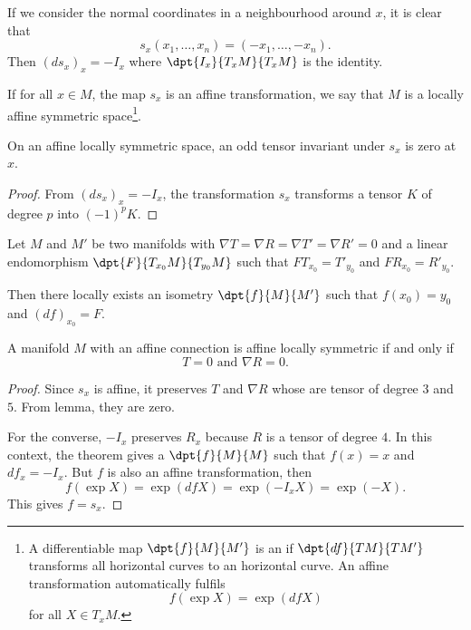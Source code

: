 If we consider the normal coordinates in a neighbourhood around $x$, it is clear that 
\[
s_x(x_1,\ldots,x_n)=(-x_1,\ldots,-x_n).
\]
 Then $(ds_x)_x=-I_x$ where $\dpt{I_x}{T_xM}{T_xM}$ is the identity.

If for all $x\in M$, the map $s_x$ is an affine transformation, we say that $M$ is a locally affine symmetric space\footnote{A differentiable map $\dpt{f}{M}{M'}$ is an  if $\dpt{df}{TM}{TM'}$ transforms all horizontal curves to an horizontal curve. An affine transformation automatically fulfils
\[
  f(\exp X)=\exp(df X)
\]
for all $X\in T_xM$.}.


\begin{lemma}
On an affine locally symmetric space, an odd tensor invariant under $s_x$ is zero at $x$.
\end{lemma}

\begin{proof}
From $(ds_x)_x=-I_x$, the transformation $s_x$ transforms a tensor $K$ of degree $p$ into $(-1)^p K$.
\end{proof}


\begin{theorem}
Let $M$ and $M'$ be two manifolds with $\nabla T=\nabla R=\nabla T'=\nabla R'=0$ and a linear endomorphism $\dpt{F}{T_{x_0}M}{T_{y_0}M}$  such that $FT_{x_0}=T'_{y_0}$ and $FR_{x_0}=R'_{y_0}$.

Then there locally exists an isometry $\dpt{f}{M}{M'}$ such that $f(x_0)=y_0$ and $(df)_{x_0}=F$.
\end{theorem}

\begin{proposition}
A manifold $M$ with an affine connection is affine locally symmetric if and only if
\[
  T=0\text{ and }\nabla R=0.
\]
\end{proposition}


\begin{proof}
Since $s_x$ is affine, it preserves $T$ and $\nabla R$ whose are tensor of degree $3$ and $5$. From lemma, they are zero.

For the converse, $-I_x$ preserves $R_x$ because $R$ is a tensor of degree $4$. In this context, the theorem gives a $\dpt{f}{M}{M}$ such that $f(x)=x$ and $df_x=-I_x$. But $f$ is also an affine transformation, then
\begin{equation}
  f(\exp X)=\exp(df X)
           =\exp(-I_x X)
           =\exp(-X).
\end{equation}
This gives $f=s_x$.
\end{proof}

